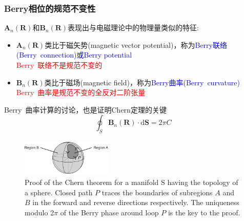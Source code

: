 {\frame
{
	\frametitle{\rm{Berry}相位的规范不变性}
	$\mathbf{A}_n(\mathbf{R})$和$\mathbf{B}_n(\mathbf{R})$表现出与电磁理论中的物理量类似的特征:
	\begin{itemize}
		\item $\mathbf{A}_n(\mathbf{R})$类比于磁矢势\textrm{(magnetic vector potential)}，称为\textcolor{blue}{\textrm{Berry}联络\textrm{(Berry~connection)}或\textrm{Berry potential}}\\
			\textcolor{red}{\textrm{Berry~}联络不是规范不变的}
		\item $\mathbf{B}_n(\mathbf{R})$类比于磁场\textrm{(magnetic field)}，称为\textcolor{blue}{\textrm{Berry}曲率\textrm{(Berry~curvature)}}\\
			\textcolor{red}{\textrm{Berry~}曲率是规范不变的全反对二阶张量}
	\end{itemize}
	{\tiny \textrm{Berry~}曲率计算的讨论，也是证明\textrm{Chern}定理的关键
	\begin{displaymath}
		\oint_S\mathbf{B}_n(\mathbf{R})\cdot\mathrm{d}\mathbf{S}=2\pi C 
	\end{displaymath}
\begin{figure}[h!]
\centering
\vspace*{-0.15in}
\includegraphics[height=0.7in,width=1.7in,viewport=0 0 1500 620,clip]{Figures/Berry-Phase_Chern.png}
\caption{\tiny \textrm{Proof of the Chern theorem for a manifold S having the topology of a sphere. Closed path $P$ traces the boundaries of subregions $A$ and $B$ in the forward and reverse directions respectively. The uniqueness modulo 2$π$ of the Berry phase around loop $P$ is the key to the proof.\cite{Berry-Phase}}}%
\label{Berry-Phase-Chern}
\end{figure}} 
}

}
